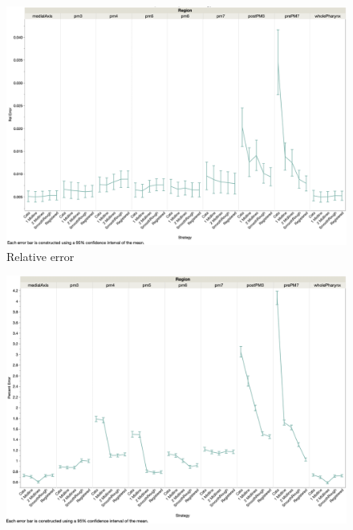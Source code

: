 \begin{figure}[ht]
    \centering
    \includegraphics[scale=0.15]{Figures/rendered_files/error_by_strategy_natural}
    \decoRule
    \caption[Error by strategy in the natural data set]{Relative error}
    \label{fig:DorsalVentralCartoon}
\end{figure}

\begin{figure}[ht]
    \centering
    \includegraphics[scale=0.15]{Figures/rendered_files/error_by_strategy_synthetic}
    \decoRule
    \caption[Error by strategy in the synthetic data set]{}
    \label{fig:DorsalVentralCartoon}
\end{figure}